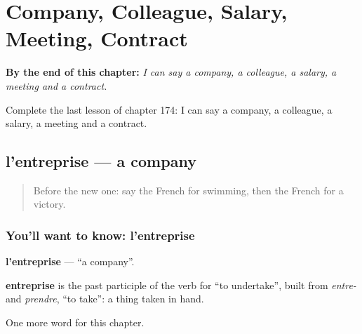 
\chapter{Company, Colleague, Salary, Meeting, Contract}
\label{ch:fr-company-colleague-salary-meeting-contract}

\begin{chapteropening}
\textbf{By the end of this chapter:} \emph{I can say a company, a colleague, a salary, a meeting and a contract.}

Complete the last lesson of chapter 174: I can say a company, a colleague, a salary, a meeting and a contract.
\end{chapteropening}

\section[l'entreprise]{l'entreprise — a company}

\label{lesson:FR-C174-entreprise}



\begin{quote}
Before the new one: say the French for swimming, then the French for a victory.
\end{quote}

\subsection*{You'll want to know: l'entreprise}
\textbf{l'entreprise} — \textquotedblleft{}a company\textquotedblright{}.

\begin{cousinweb}
\textbf{entreprise} is the past participle of the verb for \textquotedblleft{}to undertake\textquotedblright{}, built from \emph{entre-} and \emph{prendre}, \textquotedblleft{}to take\textquotedblright{}: a thing taken in hand.
\end{cousinweb}

\begin{grammarlens}[title={What you've built}]
One more word for this chapter.
\end{grammarlens}

